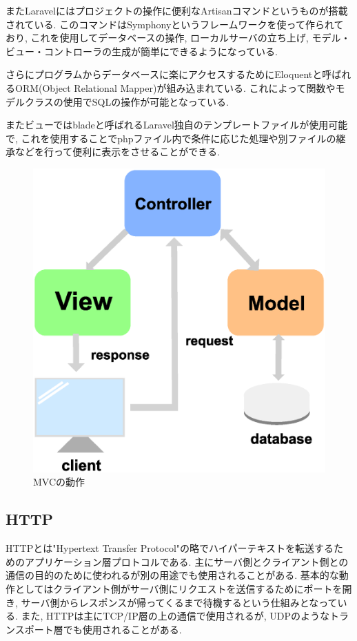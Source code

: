 \documentclass[submit,techrep]{ipsj}
\begin{document}
またLaravelにはプロジェクトの操作に便利なArtisanコマンドというものが搭載されている. このコマンドはSymphonyというフレームワークを使って作られており, これを使用してデータベースの操作, ローカルサーバの立ち上げ, モデル・ビュー・コントローラの生成が簡単にできるようになっている. 

さらにプログラムからデータベースに楽にアクセスするためにEloquentと呼ばれるORM(Object Relational Mapper)が組み込まれている. これによって関数やモデルクラスの使用でSQLの操作が可能となっている.

またビューではbladeと呼ばれるLaravel独自のテンプレートファイルが使用可能で, これを使用することでphpファイル内で条件に応じた処理や別ファイルの継承などを行って便利に表示をさせることができる. 

\begin{figure}[h]
 \centering
 \includegraphics[scale=0.17]{laravel.eps}
\caption{MVCの動作}
 \label{MVC}
\end{figure}


\subsection{HTTP}
HTTPとは"Hypertext Transfer Protocol"の略でハイパーテキストを転送するためのアプリケーション層プロトコルである. 
主にサーバ側とクライアント側との通信の目的のために使われるが別の用途でも使用されることがある. 基本的な動作としてはクライアント側がサーバ側にリクエストを送信するためにポートを開き, サーバ側からレスポンスが帰ってくるまで待機するという仕組みとなっている. 
また, HTTPは主にTCP/IP層の上の通信で使用されるが, UDPのようなトランスポート層でも使用されることがある. 
\end{document}

